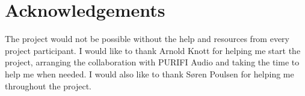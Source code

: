 \chapter*{Acknowledgements}
The project would not be possible without the help and resources from every project participant. I would like to thank Arnold Knott for helping me start the project, arranging the collaboration with PURIFI Audio and taking the time to help me when needed. I would also like to thank Søren Poulsen for helping me throughout the project. 
